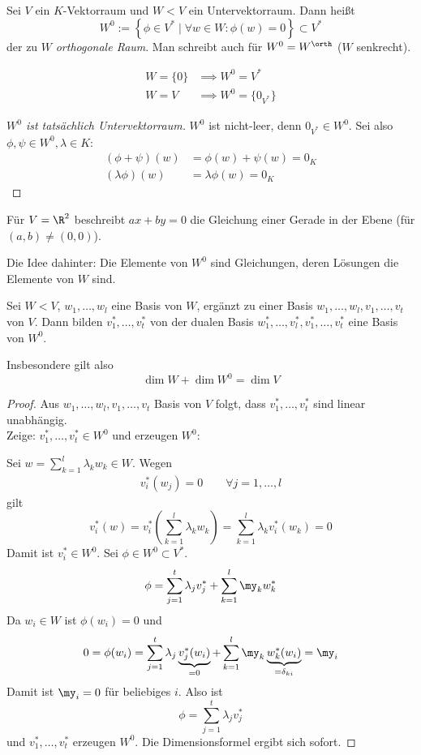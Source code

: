 \documentclass{mycourse}
\begin{document}
\begin{df}
\label{df: 9.6}
Sei $V$ ein $K$-Vektorraum und $W<V$ ein Untervektorraum.
Dann heißt
\[
W^0:=\left\{\phi\in V^*\;\big|\;\forall w\in W:\phi(w)=0 \right\} \subset V^*
\]
der zu $W$ \emph{orthogonale Raum}.
Man schreibt auch für $W^0=W^\orth$ ($W$ senkrecht).

\begin{ex}
\begin{align*}
W=\{0\} &\implies W^0=V^*\\
W=V &\implies W^0=\{0_{V^*}\}
\end{align*}
\end{ex}

\begin{proof}[$W^0$ ist tatsächlich Untervektorraum]
$W^0$ ist nicht-leer, denn $0_{V^*}\in W^0$. 
Sei also $\phi,\psi\in W^0, \lambda\in K$:
\begin{align*}
(\phi+\psi)(w)&=\phi(w)+\psi(w)=0_K\\
(\lambda\phi)(w)&=\lambda\phi(w)=0_K
\end{align*}
\end{proof}
\end{df}

\begin{ex}
	Für $V=\R^2$ beschreibt $ax+by=0$ die Gleichung einer Gerade in der Ebene (für $(a,b)\neq (0,0)$).

	Die Idee dahinter: Die Elemente von $W^0$ sind Gleichungen, deren Lösungen die Elemente von $W$ sind.
\end{ex}


\begin{prop}
\label{prop:9.7}
Sei $W<V$, $w_1,\dotsc,w_l$ eine Basis von $W$, ergänzt zu einer Basis $w_1,\dotsc,w_l,v_1,\dotsc,v_t$ von $V$.
Dann bilden $v_1^*,\dotsc,v_t^*$ von der dualen Basis $w_1^*,\dotsc,v_l^*,v_1^*,\dotsc,v_t^*$ eine Basis von $W^0$.

Insbesondere gilt also
\[
\dim W +\dim W^0=\dim V
\]
\begin{proof}
Aus $w_1,\dots,w_l,v_1,\dotsc,v_t$ Basis von $V$ folgt, dass $v_1^*,\dotsc,v_t^*$ sind linear unabhängig.\\
Zeige: $v_1^*,\dotsc,v_t^* \in W^0$ und erzeugen $W^0$:

Sei $w=\sum_{k=1}^l\lambda_kw_k \in W$.
Wegen
\begin{align*}
v_i^*(w_j)=0 \qquad \forall j=1,\dotsc,l
\end{align*}
gilt
\[
v_i^*(w)=v_i^*\left(\sum_{k=1}^l\lambda_kw_k\right)=\sum_{k=1}^l\lambda_kv_i^*(w_k)=0
\]
Damit ist $v_i^*\in W^0$.
Sei $\phi\in W^0\subset V^*$.
\[
	\phi= \sum_{j=1}^t\lambda_jv_j^*+\sum_{k=1}^l\my_kw_k^*
\]
Da $w_i\in W$ ist $\phi(w_i)=0$ und
\[
	0  = \phi(w_i)= \sum_{j=1}^t\lambda_j\underbrace{v_j^*(w_i)}_{=0}+\sum_{k=1}^l\my_k\underbrace{w_k^*(w_i)}_{=\delta_{ki}} = \my_i
\]
Damit ist $\my_i=0$ für beliebiges $i$.
Also ist
\[
\phi=\sum_{j=1}^t\lambda_jv_j^*
\]
und $v_1^*,\dotsc,v_t^*$ erzeugen $W^0$.
Die Dimensionsformel ergibt sich sofort.
\end{proof}

\end{prop}
\end{document}
